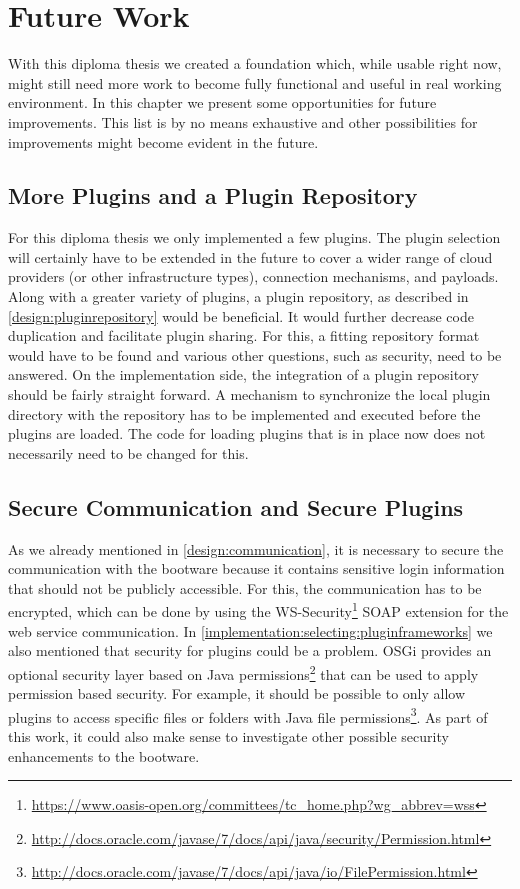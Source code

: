 \chapter{Future Work}
\label{future}

With this diploma thesis we created a foundation which, while usable right now, might still need more work to become fully functional and useful in real working environment.
In this chapter we present some opportunities for future improvements.
This list is by no means exhaustive and other possibilities for improvements might become evident in the future.

\section{More Plugins and a Plugin Repository}

For this diploma thesis we only implemented a few plugins.
The plugin selection will certainly have to be extended in the future to cover a wider range of cloud providers (or other infrastructure types), connection mechanisms, and payloads.
Along with a greater variety of plugins, a plugin repository, as described in \autoref{design:pluginrepository} would be beneficial.
It would further decrease code duplication and facilitate plugin sharing.
For this, a fitting repository format would have to be found and various other questions, such as security, need to be answered.
On the implementation side, the integration of a plugin repository should be fairly straight forward.
A mechanism to synchronize the local plugin directory with the repository has to be implemented and executed before the plugins are loaded.
The code for loading plugins that is in place now does not necessarily need to be changed for this.

\section{Secure Communication and Secure Plugins}

As we already mentioned in \autoref{design:communication}, it is necessary to secure the communication with the bootware because it contains sensitive login information that should not be publicly accessible.
For this, the communication has to be encrypted, which can be done by using the WS-Security\footnote{\url{https://www.oasis-open.org/committees/tc_home.php?wg_abbrev=wss}} SOAP extension for the web service communication.
In \autoref{implementation:selecting:pluginframeworks} we also mentioned that security for plugins could be a problem.
OSGi provides an optional security layer based on Java permissions\footnote{\url{http://docs.oracle.com/javase/7/docs/api/java/security/Permission.html}} that can be used to apply permission based security.
For example, it should be possible to only allow plugins to access specific files or folders with Java file permissions\footnote{\url{http://docs.oracle.com/javase/7/docs/api/java/io/FilePermission.html}}.
As part of this work, it could also make sense to investigate other possible security enhancements to the bootware.

